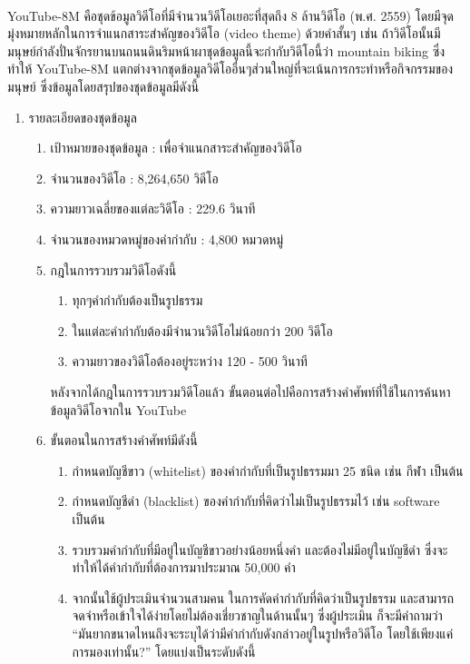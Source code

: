 YouTube-8M\textsuperscript{\cite{abu2016youtube}} คือชุดข้อมูลวิดีโอที่มีจำนวนวิดีโอเยอะที่สุดถึง 8 ล้านวิดีโอ (พ.ศ. 2559) โดยมีจุดมุ่งหมายหลักในการจำแนกสาระสำคัญของวิดีโอ (video theme) 
ด้วยคำสั้นๆ เช่น ถ้าวิดีโอนั้นมีมนุษย์กำลังปั่นจักรยานบนถนนดินริมหน้าผาชุดข้อมูลนี้จะกำกับวิดีโอนี้ว่า mountain biking ซึ่งทำให้ YouTube-8M 
แตกต่างจากชุดข้อมูลวิดีโออื่นๆส่วนใหญ่ที่จะเน้นการกระทำหรือกิจกรรมของมนุษย์ ซึ่งข้อมูลโดยสรุปของชุดข้อมูลมีดังนี้
\begin{enumerate}
	\item {รายละเอียดของชุดข้อมูล}
	\begin{enumerate}
		\setlength\itemsep{-0.25em}
		\item เป้าหมายของชุดข้อมูล : เพื่อจำแนกสาระสำคัญของวิดีโอ
		\item จำนวนของวิดีโอ : 8,264,650 วิดีโอ
		\item ความยาวเฉลี่ยของแต่ละวิดีโอ : 229.6 วินาที
		\item จำนวนของหมวดหมู่ของคำกำกับ : 4,800 หมวดหมู่
		\item กฎในการรวบรวมวิดีโอดังนี้
		\begin{enumerate}
			\setlength\itemsep{-0.25em}
			\item ทุกๆคำกำกับต้องเป็นรูปธรรม
			\item ในแต่ละคำกำกับต้องมีจำนวนวิดีโอไม่น้อยกว่า 200 วิดีโอ
			\item ความยาวของวิดีโอต้องอยู่ระหว่าง 120 - 500 วินาที
		\end{enumerate}
		หลังจากได้กฎในการรวบรวมวิดีโอแล้ว ขั้นตอนต่อไปคือการสร้างคำศัพท์ที่ใช้ในการค้นหาข้อมูลวิดีโอจากใน YouTube 
		\item ขั้นตอนในการสร้างคำศัพท์มีดังนี้
		\begin{enumerate}
			\setlength\itemsep{-0.25em}
			\item กำหนดบัญชีขาว (whitelist) ของคำกำกับที่เป็นรูปธรรมมา 25 ชนิด เช่น กีฬา เป็นต้น
			\item กำหนดบัญชีดำ (blacklist) ของคำกำกับที่คิดว่าไม่เป็นรูปธรรมไว้ เช่น software เป็นต้น
			\item รวบรวมคำกำกับที่มีอยู่ในบัญชีขาวอย่างน้อยหนึ่งคำ และต้องไม่มีอยู่ในบัญชีดำ ซึ่งจะทำให้ได้คำกำกับที่ต้องการมาประมาณ 50,000 คำ
			\item จากนั้นใช้ผู้ประเมินจำนวนสามคน ในการคัดคำกำกับที่คิดว่าเป็นรูปธรรม และสามารถจดจำหรือเข้าใจได้ง่ายโดยไม่ต้องเชี่ยวชาญในด้านนั้นๆ 
			ซึ่งผู้ประเมิน ก็จะมีคำถามว่า “มันยากขนาดไหนถึงจะระบุได้ว่ามีคำกำกับดังกล่าวอยู่ในรูปหรือวิดีโอ โดยใช้เพียงแค่การมองเท่านั้น?” โดยแบ่งเป็นระดับดังนี้
			\begin{enumerate}

\end{enumerate}
\end{enumerate}
\end{enumerate}
\end{enumerate}
